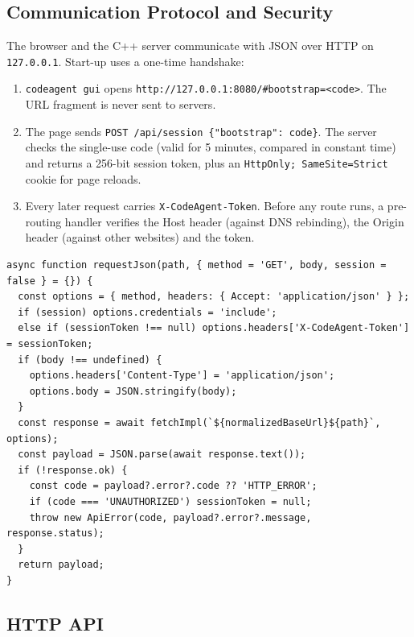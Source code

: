 \documentclass[12pt,a4paper,oneside]{book}
\begin{document}
\subsection{Communication Protocol and Security}

The browser and the C++ server communicate with JSON over HTTP on
\texttt{127.0.0.1}. Start-up uses a one-time handshake:
\begin{enumerate}
  \item \texttt{codeagent gui} opens
    \texttt{http:/\allowbreak{}/\allowbreak{}127.0.0.1:8080/\allowbreak{}\#bootstrap=<code>}. The URL fragment is
    never sent to servers.
  \item The page sends \texttt{POST /\allowbreak{}api/\allowbreak{}session \{"bootstrap": code\}}. The
    server checks the single-use code (valid for 5 minutes, compared in
    constant time) and returns a 256-bit session token, plus an
    \texttt{HttpOnly; SameSite=Strict} cookie for page reloads.
  \item Every later request carries \texttt{X-CodeAgent-Token}. Before any
    route runs, a pre-routing handler verifies the Host header (against DNS
    rebinding), the Origin header (against other websites) and the token.
\end{enumerate}

\begin{lstlisting}[style=codeagentplain,caption={The single HTTP function of the frontend (\texttt{frontend/js/api.js}, abridged)},label={lst:ca-fetch}]
async function requestJson(path, { method = 'GET', body, session = false } = {}) {
  const options = { method, headers: { Accept: 'application/json' } };
  if (session) options.credentials = 'include';
  else if (sessionToken !== null) options.headers['X-CodeAgent-Token'] = sessionToken;
  if (body !== undefined) {
    options.headers['Content-Type'] = 'application/json';
    options.body = JSON.stringify(body);
  }
  const response = await fetchImpl(`${normalizedBaseUrl}${path}`, options);
  const payload = JSON.parse(await response.text());
  if (!response.ok) {
    const code = payload?.error?.code ?? 'HTTP_ERROR';
    if (code === 'UNAUTHORIZED') sessionToken = null;
    throw new ApiError(code, payload?.error?.message, response.status);
  }
  return payload;
}
\end{lstlisting}

\subsection{HTTP API}
\end{document}
